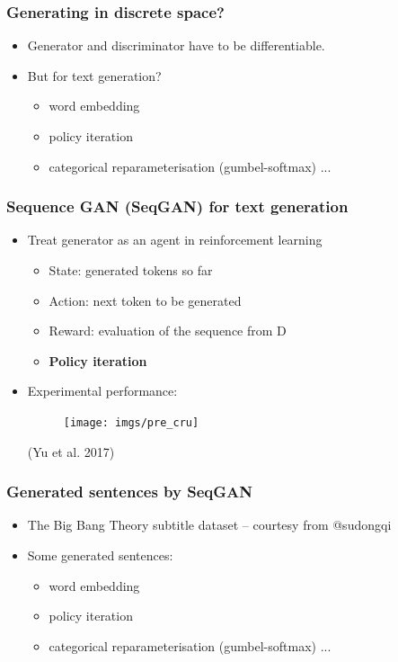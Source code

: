 \documentclass{beamer}
\begin{document}
\begin{frame}
\frametitle{Generating in discrete space?}
\begin{itemize}
\item Generator and discriminator have to be differentiable.
\item But for text generation?
	\begin{itemize}
		\item word embedding
		\item policy iteration
		\item categorical reparameterisation (gumbel-softmax) ...

	\end{itemize}
\end{itemize}
\end{frame}



\begin{frame}
\frametitle{Sequence GAN (SeqGAN) for text generation}
\begin{itemize}
\item Treat generator as an agent in reinforcement learning
	\begin{itemize}
		\item State: generated tokens so far
		\item Action: next token to be generated
		\item Reward: evaluation of the sequence from D
		\item \textbf{Policy iteration}
	\end{itemize} 
\item Experimental performance:
\begin{figure}
\centering
\texttt{[image: imgs/pre\_cru]}
\end{figure}
\vspace{-.2cm}
\hspace{9cm}\tiny{(Yu et al. 2017)}
\end{itemize}
\end{frame}


\begin{frame}
\frametitle{Generated sentences by SeqGAN}
\begin{itemize}
\item The Big Bang Theory subtitle dataset -- courtesy from @sudongqi
\item Some generated sentences:
	\begin{itemize}
		\item word embedding
		\item policy iteration
		\item categorical reparameterisation (gumbel-softmax) ...

	\end{itemize}
\end{itemize}
\end{frame}
\end{document}
